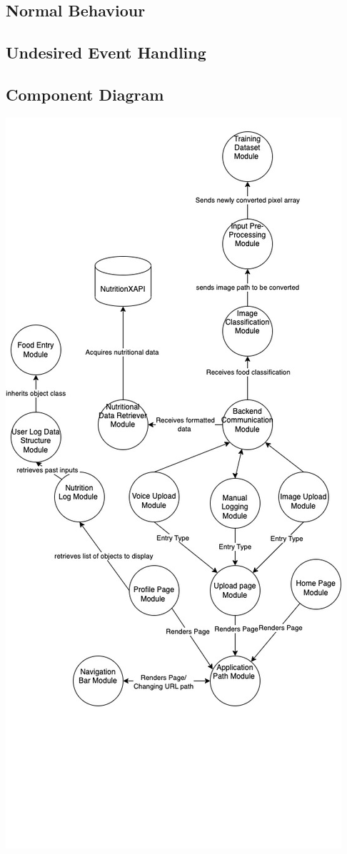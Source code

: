 \documentclass[12pt, titlepage]{article}
\begin{document}
\subsection{Normal Behaviour}

\subsection{Undesired Event Handling}


\subsection{Component Diagram}

\includegraphics[scale=0.75]{componentdiagram.jpg}
\end{document}
